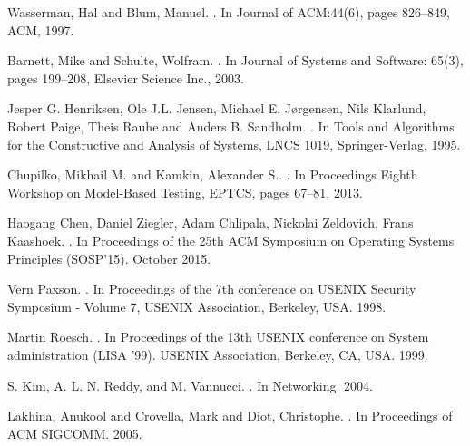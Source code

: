 \documentclass[conference]{IEEEtran}
\begin{document}
\begin{thebibliography}{1}
{Wasserman, Hal and Blum, Manuel}.
.
\newblock In {Journal of ACM:44(6)}, pages 826--849, ACM, 1997.

{Barnett, Mike and Schulte, Wolfram}.
.
\newblock In {Journal of Systems and Software: 65(3)}, pages 199--208, Elsevier Science Inc., 2003.

{Jesper G. Henriksen, Ole J.L. Jensen, Michael E. Jørgensen, Nils Klarlund, Robert Paige, Theis Rauhe and Anders B. Sandholm}.
.
\newblock In {Tools and Algorithms for the Constructive and Analysis of Systems}, LNCS 1019, Springer-Verlag, 1995.



{Chupilko, Mikhail M. and Kamkin, Alexander S.}.
.
\newblock In {Proceedings Eighth Workshop on Model-Based Testing}, EPTCS, pages 67--81, 2013.

{Haogang Chen, Daniel Ziegler, Adam Chlipala, Nickolai Zeldovich, Frans Kaashoek}.
.
\newblock In {Proceedings of the 25th ACM Symposium on Operating Systems Principles (SOSP'15)}. October 2015.

{Vern Paxson}.
.
\newblock In {Proceedings of the 7th conference on USENIX Security Symposium - Volume 7, USENIX Association, Berkeley, USA}. 1998.

{Martin Roesch}.
.
\newblock In {Proceedings of the 13th USENIX conference on System administration (LISA '99). USENIX Association, Berkeley, CA, USA}. 1999.



{S. Kim, A. L. N. Reddy, and M. Vannucci}.
.
\newblock In {Networking}. 2004.

{Lakhina, Anukool and Crovella, Mark and Diot, Christophe}.
.
\newblock In {Proceedings of ACM SIGCOMM}. 2005.





\end{thebibliography}
\end{document}
